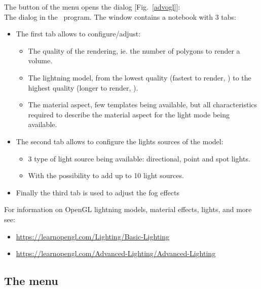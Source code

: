 The  button of the  menu opens the  dialog [Fig.~\ref{advogl}]:\\
{The  dialog in the \atomes\ program.}
\laf The window contains a notebook with 3 tabs:
\begin{itemize}
\item The first tab allows to configure/adjust:
\begin{itemize}
\item The quality of the rendering, ie. the number of polygons to render a volume. 
\item The lightning model, from the lowest quality (fastest to render, ) to the highest quality (longer to render, ).
\item The material aspect, few templates being available, but all characteristics required to describe the material aspect for the light mode being available. 
\end{itemize}
\item The second tab allows to configure the lights sources of the model: 
\begin{itemize}
\item 3 type of light source being available: directional, point and spot lights.
\item With the possibility to add up to 10 light sources. 
\end{itemize}
\item Finally the third tab is used to adjust the fog effects 
\end{itemize}
For information on OpenGL lightning models, material effects, lights, and more see: 
\begin{itemize}
\item \href{https://learnopengl.com/Lighting/Basic-Lighting}{https://learnopengl.com/Lighting/Basic-Lighting}
\item \href{https://learnopengl.com/Advanced-Lighting/Advanced-Lighting}{https://learnopengl.com/Advanced-Lighting/Advanced-Lighting}
\end{itemize}

\clearpage

\subsection{The  menu}
\label{modelm}
\vspace{-0.25cm}
\modlfig

